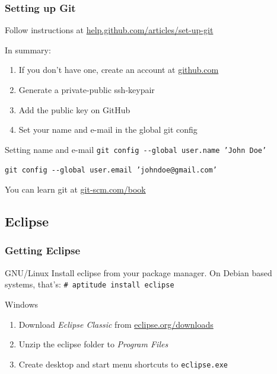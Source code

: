 \documentclass{beamer}
\begin{document}
\begin{frame}[<+->]
  \frametitle{Setting up Git}
	Follow instructions at \href{https://help.github.com/articles/set-up-git}{help.github.com/articles/set-up-git}

  	In summary:\pause
  \begin{enumerate}
	\item If you don't have one, create an account at \href{http://github.com}{github.com}
	\item Generate a private-public ssh-keypair
	\item Add the public key on GitHub
	\item Set your name and e-mail in the global git config
  \end{enumerate}
  \begin{block}{Setting name and e-mail}
	\texttt{git config \--\--global user.name 'John Doe'}

	\texttt{git config \--\--global user.email 'johndoe@gmail.com'}
  \end{block}\pause
  You can learn git at \href{http://git-scm.com/book}{git-scm.com/book}
\end{frame}

\subsection{Eclipse}
\begin{frame}[<+->]
  \frametitle{Getting Eclipse}
  \begin{block}{GNU/Linux}
	Install eclipse from your package manager. On Debian based systems, that's: \texttt{\# aptitude install eclipse}
  \end{block}
  \begin{block}{Windows}
	\begin{enumerate}
	  \item Download \emph{Eclipse Classic} from \href{http://www.eclipse.org/downloads/}{eclipse.org/downloads}
	  \item Unzip the eclipse folder to \textit{Program Files}
	  \item Create desktop and start menu shortcuts to \texttt{eclipse.exe}
	\end{enumerate}
  \end{block}
\end{frame}
\end{document}
